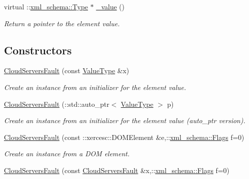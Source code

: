 \begin{DoxyCompactItemize}
virtual ::\hyperlink{namespacexml__schema_ad34e8fd175bf4f9fece6c670b01aa239}{xml\_\-schema::Type} $\ast$ \hyperlink{classopenstack_1_1xml_1_1CloudServersFault_a6729be609a925fabe967556908859333}{\_\-value} ()
\begin{DoxyCompactList}\small\item\em Return a pointer to the element value. \item\end{DoxyCompactList}\end{DoxyCompactItemize}
\subsection*{Constructors}
\begin{DoxyCompactItemize}
\item 
\hyperlink{classopenstack_1_1xml_1_1CloudServersFault_a751d943c98620c5a65168c994190668b}{CloudServersFault} (const \hyperlink{classopenstack_1_1xml_1_1CloudServersAPIFault}{ValueType} \&x)
\begin{DoxyCompactList}\small\item\em Create an instance from an initializer for the element value. \item\end{DoxyCompactList}\item 
\hyperlink{classopenstack_1_1xml_1_1CloudServersFault_ae43649f8b87ac0ec36b543e139358c3d}{CloudServersFault} (::std::auto\_\-ptr$<$ \hyperlink{classopenstack_1_1xml_1_1CloudServersAPIFault}{ValueType} $>$ p)
\begin{DoxyCompactList}\small\item\em Create an instance from an initializer for the element value (auto\_\-ptr version). \item\end{DoxyCompactList}\item 
\hyperlink{classopenstack_1_1xml_1_1CloudServersFault_a780a22cbabfc8637265d23c561818f1f}{CloudServersFault} (const ::xercesc::DOMElement \&e,::\hyperlink{namespacexml__schema_affb4c227cbd9aa7453dd1dc5a1401943}{xml\_\-schema::Flags} f=0)
\begin{DoxyCompactList}\small\item\em Create an instance from a DOM element. \item\end{DoxyCompactList}\item 
\hyperlink{classopenstack_1_1xml_1_1CloudServersFault_aa196bff3af75d0df350e75514c04e011}{CloudServersFault} (const \hyperlink{classopenstack_1_1xml_1_1CloudServersFault}{CloudServersFault} \&x,::\hyperlink{namespacexml__schema_affb4c227cbd9aa7453dd1dc5a1401943}{xml\_\-schema::Flags} f=0)

\end{DoxyCompactItemize}
